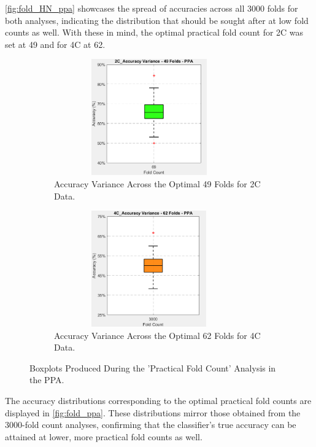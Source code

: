 \autoref{fig:fold_HN_ppa} showcases the spread of accuracies across all 3000 folds for both analyses, indicating the distribution that should be sought after at low fold counts as well. With these in mind, the optimal practical fold count for \gls{2C} was set at 49 and for \gls{4C} at 62.

\begin{figure}[htbp]
 	\centering
	\begin{subfigure}{0.49\textwidth}
		\centering
		\includegraphics[width = 0.9\textwidth, height = 5cm]{assets/images/box_2C_49_ppa.png}
		\caption{Accuracy Variance Across the Optimal 49 Folds for \gls{2C} Data.}
		\label{fig:2C_49_ppa}
	\end{subfigure}
	\hfill
	\begin{subfigure}{0.49\textwidth}
		\centering
	 	\includegraphics[width = 0.9\textwidth, height = 5cm]{assets/images/box_4C_62_ppa.png}
		\caption{Accuracy Variance Across the Optimal 62 Folds for \gls{4C} Data.}
		\label{fig:4C_62_ppa}
	\end{subfigure}
	\caption[Accuracies At Optimal Fold Count Boxplots For The PPA]{Boxplots Produced During the 'Practical Fold Count' Analysis in the \gls{PPA}.}
 	\label{fig:fold_ppa}
\end{figure}

The accuracy distributions corresponding to the optimal practical fold counts are displayed in \autoref{fig:fold_ppa}. These distributions mirror those obtained from the 3000-fold count analyses, confirming that the classifier's true accuracy can be attained at lower, more  practical fold counts as well.

